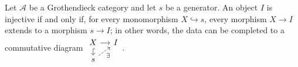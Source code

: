 \begin{lemma}\label{prop:Grothendieck-injective-criterion}
Let $\mathcal{A}$ be a Grothendieck category and let $s$ be a generator. An
object $I$ is injective if and only if, for every monomorphism
$X\hookrightarrow s$, every morphism $X\to I$ extends to a morphism
$s\to I$; in other words, the data can be completed to a commutative diagram
$\begin{tikzcd}[row sep=small,column sep=small]
	X\arrow[r]\arrow[hookrightarrow,d]&I\\
	s\arrow[dashed,ru,"\exists"']&
\end{tikzcd}$.
\end{lemma}
